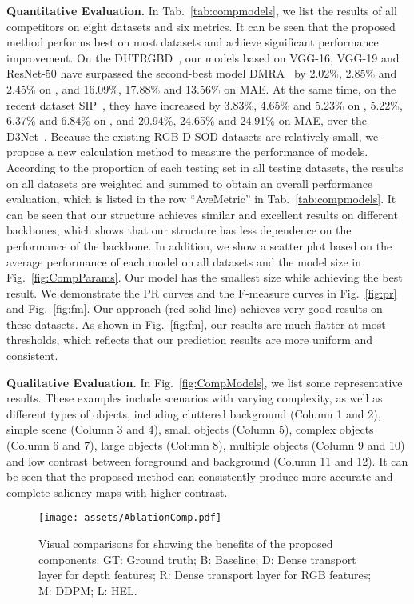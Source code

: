 \documentclass[runningheads]{llncs}
\begin{document}
\noindent\textbf{Quantitative Evaluation.}
In Tab.~\ref{tab:compmodels}, we list the results of all competitors on eight datasets and six metrics. It can be seen that the proposed method performs best on most datasets and achieve significant performance improvement.
On the DUTRGBD~\cite{DUTRGBD}, our models based on VGG-16, VGG-19 and ResNet-50 have surpassed the second-best model DMRA~\cite{DUTRGBD} by 2.02\%, 2.85\% and 2.45\% on , and 16.09\%, 17.88\% and 13.56\% on MAE. At the same time, on the recent dataset SIP~\cite{SIP}, they have increased by 3.83\%, 4.65\% and 5.23\% on , 5.22\%, 6.37\% and 6.84\% on , and 20.94\%, 24.65\% and 24.91\% on MAE, over the D3Net~\cite{SIP}.
Because the existing RGB-D SOD datasets are relatively small, we propose a new calculation method to measure the performance of models. According to the proportion of each testing set in all testing datasets, the results on all datasets are weighted and summed to obtain an overall performance evaluation, which is listed in the row ``AveMetric'' in Tab.~\ref{tab:compmodels}.
It can be seen that our structure achieves similar and excellent results on different backbones, which shows that our structure has less dependence on the performance of the backbone.
In addition, we show a scatter plot based on the average performance of each model on all datasets and the model size in Fig.~\ref{fig:CompParams}. Our model has the smallest size while achieving the best result. We demonstrate the PR curves and the F-measure curves in Fig.~\ref{fig:pr} and Fig.~\ref{fig:fm}. Our approach (red solid line) achieves very good results on these datasets. As shown in Fig.~\ref{fig:fm}, our results are much flatter at most thresholds, which reflects that our prediction results are more uniform and consistent.

\noindent\textbf{Qualitative Evaluation.}
In Fig.~\ref{fig:CompModels}, we list some representative results. These examples include scenarios with varying complexity, as well as different types of objects, including cluttered background (Column 1 and 2), simple scene (Column 3 and 4), small objects (Column 5), complex objects (Column 6 and 7), large objects (Column 8), multiple objects (Column 9 and 10) and low contrast between foreground and background (Column 11 and 12).
It can be seen that the proposed method can consistently produce more accurate and complete saliency maps with higher contrast.

\begin{figure}[t]
 \begin{center}
  \texttt{[image: assets/AblationComp.pdf]}
  \caption{Visual comparisons for showing the benefits of the proposed components. GT: Ground truth; B: Baseline; D: Dense transport layer for depth features; R: Dense transport layer for RGB features; M: DDPM; L: HEL.}
  \label{fig:AblationComp}
 \end{center}
\end{figure}
\end{document}
